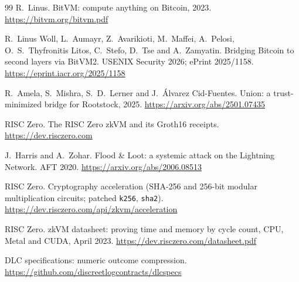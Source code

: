 \documentclass[11pt]{article}
\begin{document}
\begin{thebibliography}{99}
 R.~Linus. BitVM: compute anything on Bitcoin, 2023. \url{https://bitvm.org/bitvm.pdf}

 R.~Linus Woll, L.~Aumayr, Z.~Avarikioti, M.~Maffei, A.~Pelosi, O.~S.~Thyfronitis Litos, C.~Stefo, D.~Tse and A.~Zamyatin. Bridging Bitcoin to second layers via BitVM2. USENIX Security 2026; ePrint 2025/1158. \url{https://eprint.iacr.org/2025/1158}

 R.~Amela, S.~Mishra, S.~D.~Lerner and J.~\'Alvarez Cid-Fuentes. Union: a trust-minimized bridge for Rootstock, 2025. \url{https://arxiv.org/abs/2501.07435}

 RISC Zero. The RISC Zero zkVM and its Groth16 receipts. \url{https://dev.risczero.com}

 J.~Harris and A.~Zohar. Flood \& Loot: a systemic attack on the Lightning Network. AFT 2020. \url{https://arxiv.org/abs/2006.08513}

 RISC Zero. Cryptography acceleration (SHA-256 and 256-bit modular multiplication circuits; patched \texttt{k256}, \texttt{sha2}). \url{https://dev.risczero.com/api/zkvm/acceleration}

 RISC Zero. zkVM datasheet: proving time and memory by cycle count, CPU, Metal and CUDA, April 2023. \url{https://dev.risczero.com/datasheet.pdf}

 DLC specifications: numeric outcome compression. \url{https://github.com/discreetlogcontracts/dlcspecs}

\end{thebibliography}
\end{document}

